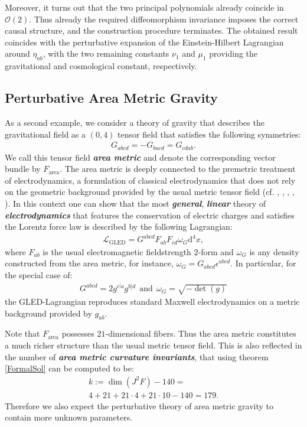 \documentclass[%
preprint,
nofootinbib,
amsmath,amssymb,
aps,
prd,
floatfix,
]{revtex4-2}
\begin{document}
Moreover, it turns out that the two principal polynomials already coincide in $\mathcal{O}(2)$. 
Thus already the required diffeomorphism invariance imposes the correct causal structure, and the construction procedure terminates. 
The obtained result coincides with the perturbative expansion of the Einstein-Hilbert Lagrangian around $\eta_{ab}$, with the two remaining constants $\nu_1$ and $\mu_1$ providing the gravitational and cosmological constant, respectively.
\subsection{Perturbative Area Metric Gravity}
As a second example, we consider a theory of gravity that describes the gravitational field as a $(0,4)$ tensor field that satisfies the following symmetries:
\begin{align}\label{areaSym}
    G_{abcd} = -G_{bacd} = G_{cdab}.
\end{align}
We call this tensor field \textit{\textbf{area metric}} and denote the corresponding vector bundle by $F_{\text{area}}$. 
The area metric is deeply connected to the premetric treatment of electrodynamics, a formulation of classical electrodynamics that does not rely on the geometric background provided by the usual metric tensor field (cf. \cite{hehl2003foundations}, \cite{Hehl2005}, \cite{2004PhRvD..70j5022L}, \cite{1999PhLB..458..466O}, \cite{2009JPhA...42U5402I}).
In this context one can show that the most \textit{\textbf{general}}, \textit{\textbf{linear}} theory of \textit{\textbf{electrodynamics}} that features the conservation of electric charges and satisfies the Lorentz force law is described by the following Lagrangian:
\begin{align}
    \mathcal{L}_{\text{GLED}} =  G^{abcd}F_{ab}F_{cd}\omega_G\mathrm{d}^4x,
\end{align}
where $F_{ab}$ is the usual electromagnetic fieldstrength $2$-form and $\omega_G$ is any density constructed from the area metric, for instance, $\omega_G = G_{abcd}\epsilon^{abcd}$. 
In particular, for the special case of:
\begin{align}
    G^{abcd} = 2 g^{c^[a}g^{b]d} \ \ \text{and} \ \  \omega_{G}=\sqrt{ -\operatorname{det}(g) }
\end{align}
the GLED-Lagrangian reproduces standard Maxwell electrodynamics on a metric background provided by $g_{ab}$.

Note that $F_{\text{area}}$ possesses $21$-dimensional fibers. Thus the area metric constitutes a much richer structure than the usual metric tensor field. This is also reflected in the number of \textit{\textbf{area metric curvature invariants}}, that using theorem \ref{FormalSol} can be computed to be:
\begin{multline}
    k:= \operatorname{dim}(J^2F) - 140 =\\
    4 + 21 + 21\cdot 4 + 21\cdot10 -140 = 179.
\end{multline}
Therefore we also expect the perturbative theory of area metric gravity to contain more unknown parameters.
\end{document}
